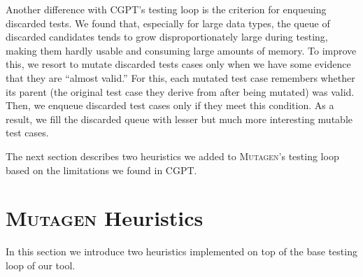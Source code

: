 \documentclass[sigconf, anonymous, review]{acmart}
\newcommand{\mutagen}{\textsc{Mutagen}\xspace}
\begin{document}
Another difference with CGPT's testing loop is the criterion for enqueuing
discarded tests.
%
We found that, especially for large data types, the queue of discarded
candidates tends to grow disproportionately large during testing, making them
hardly usable and consuming large amounts of memory.
%
To improve this, we resort to mutate discarded tests cases only when we have
some evidence that they are ``almost valid.''
%
For this, each mutated test case remembers whether its parent (the original test
case they derive from after being mutated) was valid.
%
Then, we enqueue discarded test cases only if they meet this condition.
%
As a result, we fill the discarded queue with lesser but much more interesting
mutable test cases.

\begin{algorithm}[t]
  \SetAlgoLined
  \DontPrintSemicolon
\caption{\label{algo:mutagen:pick}\mutagen Seed Selection}
\end{algorithm}


The next section describes two heuristics we added to \mutagen's testing loop
based on the limitations we found in CGPT.
%



\section{\mutagen Heuristics}
\label{sec:heuristics}


In this section we introduce two heuristics implemented on top of the base
testing loop of our tool.
\end{document}
